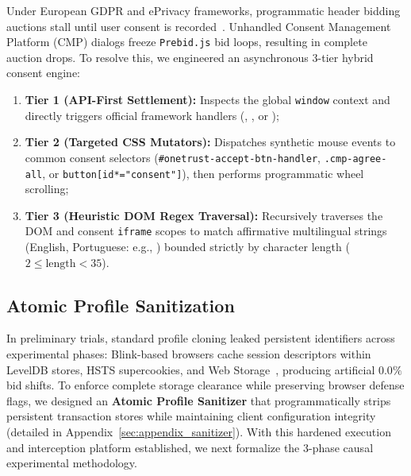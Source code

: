 Under European GDPR and ePrivacy frameworks, programmatic header bidding auctions stall until user consent is recorded~\cite{papadogiannakis2021user}. Unhandled Consent Management Platform (CMP) dialogs freeze \texttt{Prebid.js} bid loops, resulting in complete auction drops. 
To resolve this, we engineered an asynchronous 3-tier hybrid consent engine:
\begin{enumerate}
    \item \textbf{Tier 1 (API-First Settlement):} Inspects the global \texttt{window} context and directly triggers official framework handlers (, , or );
    \item \textbf{Tier 2 (Targeted CSS Mutators):} Dispatches synthetic mouse events to common consent selectors (\texttt{\#onetrust-\allowbreak{}accept-\allowbreak{}btn-\allowbreak{}handler}, \texttt{.cmp-\allowbreak{}agree-\allowbreak{}all}, or \texttt{button[id*="consent"]}), then performs programmatic wheel scrolling;
    \item \textbf{Tier 3 (Heuristic DOM Regex Traversal):} Recursively traverses the DOM and consent \texttt{iframe} scopes to match affirmative multilingual strings (English, Portuguese: e.g., ) bounded strictly by character length ($2 \le \text{length} < 35$).
\end{enumerate}

\subsection{Atomic Profile Sanitization}
\label{subsec:profile_sanitization}

In preliminary trials, standard profile cloning leaked persistent identifiers across experimental phases: Blink-based browsers cache session descriptors within LevelDB stores, HSTS supercookies, and Web Storage~\cite{acar2014web, whatwg_webstorage}, producing artificial $0.0\%$ bid shifts. 
To enforce complete storage clearance while preserving browser defense flags, we designed an \textbf{Atomic Profile Sanitizer} that programmatically strips persistent transaction stores while maintaining client configuration integrity (detailed in Appendix~\ref{sec:appendix_sanitizer}). 
With this hardened execution and interception platform established, we next formalize the 3-phase causal experimental methodology.